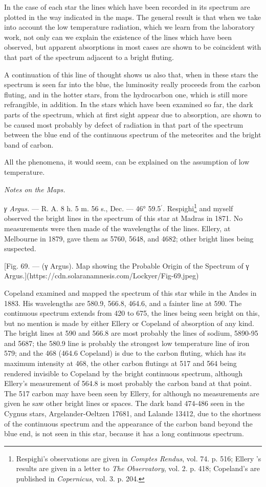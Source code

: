 \documentclass[a4paper, 12pt, oneside, polutonikogreek, english]{article}
\begin{document}
In the case of each star the lines which have been recorded in its spectrum are plotted in the way indicated in the maps. The general result is that when we take into account the low temperature radiation, which we learn from the laboratory work, not only can we explain the existence of the lines which have been observed, but apparent absorptions in most cases are shown to be coincident with that part of the spectrum adjacent to a bright fluting.

A continuation of this line of thought shows us also that, when in these stars the spectrum is seen far into the blue, the luminosity really proceeds from the carbon fluting, and in the hotter stars, from the hydrocarbon one, which is still more refrangible, in addition. In the stars which have been examined so far, the dark parts of the spectrum, which at first sight appear due to absorption, are shown to be caused most probably by defect of radiation in that part of the spectrum between the blue end of the continuous spectrum of the meteorites and the bright band of carbon.

All the phenomena, it would seem, can be explained on the assumption of low temperature.

\emph{Notes on the Maps.}

\emph{γ Argus.} --- R. A. 8 h. 5 m. 56 s., Dec. --- 46° 59.5$^{\prime}$. Respighi\footnote{Respighi's observations are given in \emph{Comptes Rendus}, vol. 74. p. 516; Ellery 's results are given in a letter to \emph{The Observatory}, vol. 2. p. 418; Copeland's are published in \emph{Copernicus}, vol. 3. p. 204.} and myself observed the bright lines in the spectrum of this star at Madras in 1871. No measurements were then made of the wavelengths of the lines. Ellery, at Melbourne in 1879, gave them as 5760, 5648, and 4682; other bright lines being suspected.

[Fig. 69. --- (γ Argus). Map showing the Probable Origin of the Spectrum of γ Argus.](https://cdn.solaranamnesis.com/Lockyer/Fig-69.jpeg)

Copeland examined and mapped the spectrum of this star while in the Andes in 1883. His wavelengths are 580.9, 566.8, 464.6, and a fainter line at 590. The continuous spectrum extends from 420 to 675, the lines being seen bright on this, but no mention is made by either Ellery or Copeland of absorption of any kind. The bright lines at 590 and 566.8 are most probably the lines of sodium, 5890-95 and 5687; the 580.9 line is probably the strongest low temperature line of iron 579; and the 468 (464.6 Copeland) is due to the carbon fluting, which has its maximum intensity at 468, the other carbon flutings at 517 and 564 being rendered invisible to Copeland by the bright continuous spectrum, although Ellery's measurement of 564.8 is most probably the carbon band at that point. The 517 carbon may have been seen by Ellery, for although no measurements are given he saw other bright lines or spaces. The dark band 474-486 seen in the Cygnus stars, Argelander-Oeltzen 17681, and Lalande 13412, due to the shortness of the continuous spectrum and the appearance of the carbon band beyond the blue end, is not seen in this star, because it has a long continuous spectrum.
\end{document}
